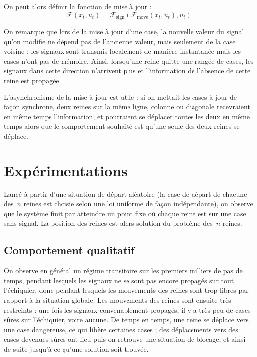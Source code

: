 \bigskip

\noindent
On peut alors définir la fonction de mise à jour : $$\mathcal{F}(x_t, u_t) = \mathcal{F}_{\mathrm{sign}}(\mathcal{F}_{\mathrm{move}}(x_t, u_t), u_t)$$


On remarque que lors de la mise à jour d'une case, la nouvelle valeur du signal qu'on modifie ne dépend pas de l'ancienne valeur, mais seulement de la case voisine : les signaux sont transmis localement de manière instantanée mais les cases n'ont pas de mémoire. Ainsi, lorsqu'une reine quitte une rangée de cases, les signaux dans cette direction n'arrivent plus et l'information de l'absence de cette reine est propagée. 

L'asynchronisme de la mise à jour est utile : si on mettait les cases à jour de façon synchrone, deux reines sur la même ligne, colonne ou diagonale recevraient en même temps l'information, et pourraient se déplacer toutes les deux en même temps alors que le comportement souhaité est qu'une seule des deux reines se déplace. 










\section{Expérimentations}


Lancé à partir d'une situation de départ aléatoire (la case de départ de chacune des~$n$ reines est choisie selon une loi uniforme de façon indépendante), on observe que le système finit par atteindre un point fixe où chaque reine est sur une case sans signal. La position des reines est alors solution du problème des~$n$ reines.

\subsection{Comportement qualitatif}

On observe en général un régime transitoire sur les premiers milliers de pas de temps, pendant lesquels les signaux ne se sont pas encore propagés sur tout l'échiquier, donc pendant lesquels les mouvements des reines sont trop libres par rapport à la situation globale. Les mouvements des reines sont ensuite très restreints : une fois les signaux convenablement propagés, il y a très peu de cases sûres sur l'échiquier, voire aucune. De temps en temps, une reine se déplace vers une case dangereuse, ce qui libère certaines cases ; des déplacements vers des cases devenues sûres ont lieu puis on retrouve une situation de blocage, et ainsi de suite jusqu'à ce qu'une solution soit trouvée.

